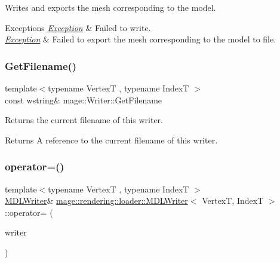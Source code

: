 Writes and exports the mesh corresponding to the model.


\begin{DoxyExceptions}{Exceptions}
{\em \mbox{\hyperlink{classmage_1_1_exception}{Exception}}} & Failed to write. \\
\hline
{\em \mbox{\hyperlink{classmage_1_1_exception}{Exception}}} & Failed to export the mesh corresponding to the model to file. \\
\hline
\end{DoxyExceptions}
\mbox{\label{classmage_1_1rendering_1_1loader_1_1_m_d_l_writer_aedbc8d5fa02444ecba2e040ca8e98281}} 
\subsubsection{\texorpdfstring{Get\+Filename()}{GetFilename()}}
{\footnotesize\ttfamily template$<$typename VertexT , typename IndexT $>$ \\
const wstring\& mage\+::\+Writer\+::\+Get\+Filename\hspace{0.3cm}{\ttfamily [noexcept]}}

Returns the current filename of this writer.

\begin{DoxyReturn}{Returns}
A reference to the current filename of this writer. 
\end{DoxyReturn}
\mbox{\label{classmage_1_1rendering_1_1loader_1_1_m_d_l_writer_a9e5f38a8b5016534385039d44d3d71dc}} 
\subsubsection{\texorpdfstring{operator=()}{operator=()}\hspace{0.1cm}{\footnotesize\ttfamily [1/2]}}
{\footnotesize\ttfamily template$<$typename VertexT , typename IndexT $>$ \\
\mbox{\hyperlink{classmage_1_1rendering_1_1loader_1_1_m_d_l_writer}{M\+D\+L\+Writer}}\& \mbox{\hyperlink{classmage_1_1rendering_1_1loader_1_1_m_d_l_writer}{mage\+::rendering\+::loader\+::\+M\+D\+L\+Writer}}$<$ VertexT, IndexT $>$\+::operator= (\begin{DoxyParamCaption}\item[{const \mbox{\hyperlink{classmage_1_1rendering_1_1loader_1_1_m_d_l_writer}{M\+D\+L\+Writer}}$<$ VertexT, IndexT $>$ \&}]{writer }\end{DoxyParamCaption})\hspace{0.3cm}{\ttfamily [delete]}}

